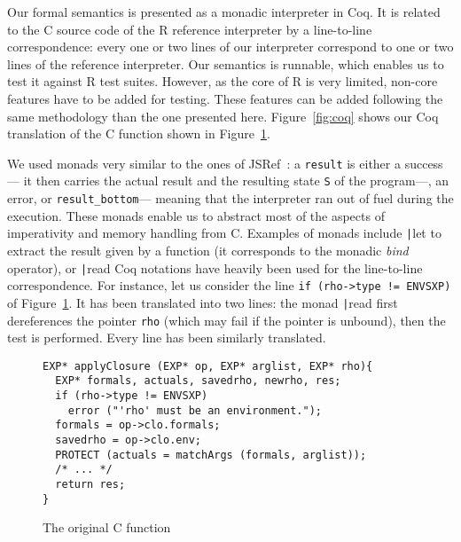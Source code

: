 \documentclass[9pt, sigplan, natbib=false, screen=true]{acmart}
\newcommand\Coq{Coq}
\newcommand\R{R}
\newcommand\Cn{C}
\begin{document}
Our formal semantics is presented as a monadic interpreter in \Coq{}.
It is related to the \Cn{} source code of the \R{} reference interpreter
by a line-to-line correspondence:
every one or two lines of our interpreter
correspond to one or two lines of the reference interpreter.
Our semantics is runnable,
which enables us to test it against \R{} test suites.
However, as the core of \R{} is very limited,
non-core features have to be added for testing.
These features can be added following the same methodology than the one presented here.
Figure~\ref{fig:coq} shows our \Coq{} translation
of the \Cn{} function shown in Figure~\ref{fig:c}.

We used monads very similar to the ones of JSRef~\parencite{popl14jscert}:
a \texttt{result} is either a success---%
it then carries the actual result and the resulting state
\texttt{S} of the program---,
an error, or \texttt{result_bottom}---%
meaning that the interpreter ran out of fuel during the execution.
These monads enable us to abstract most of the aspects
of imperativity and memory handling from \Cn{}.
Examples of monads include
\texttt|let%
to extract the result given by a function
(it corresponds to the monadic \emph{bind} operator),
or \texttt|read%
\Coq{} notations have heavily been used
for the line-to-line correspondence.
For instance, let us consider
the line \texttt{if (rho->type != ENVSXP)}
of Figure~\ref{fig:c}.
It has been translated into two lines:
the monad \texttt|read%
first dereferences the pointer \texttt{rho}
(which may fail if the pointer is unbound),
then the test is performed.
Every line has been similarly translated.

\begin{figure}
\begin{verbatim}
EXP* applyClosure (EXP* op, EXP* arglist, EXP* rho){
  EXP* formals, actuals, savedrho, newrho, res;
  if (rho->type != ENVSXP)
    error ("'rho' must be an environment.");
  formals = op->clo.formals;
  savedrho = op->clo.env;
  PROTECT (actuals = matchArgs (formals, arglist));
  /* ... */
  return res;
}
\end{verbatim}
    \vspace{-2mm} %
    \caption{The original \Cn{} function}
    \label{fig:c}
\end{figure}
\end{document}
